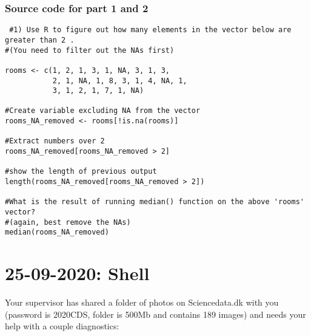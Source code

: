 \documentclass{article}
\begin{document}
\subsubsection {Source code for part 1 and 2}
\begin{verbatim}
 #1) Use R to figure out how many elements in the vector below are greater than 2 .
#(You need to filter out the NAs first)

rooms <- c(1, 2, 1, 3, 1, NA, 3, 1, 3, 
           2, 1, NA, 1, 8, 3, 1, 4, NA, 1, 
           3, 1, 2, 1, 7, 1, NA)

#Create variable excluding NA from the vector
rooms_NA_removed <- rooms[!is.na(rooms)] 

#Extract numbers over 2
rooms_NA_removed[rooms_NA_removed > 2]

#show the length of previous output
length(rooms_NA_removed[rooms_NA_removed > 2])

#What is the result of running median() function on the above 'rooms' vector?
#(again, best remove the NAs)
median(rooms_NA_removed)
\end{verbatim}

\section{25-09-2020: Shell}
Your supervisor has shared a folder of photos on Sciencedata.dk with you (password is 2020CDS, folder is 500Mb and contains 189 images) and needs your help with a couple diagnostics:
\end{document}
